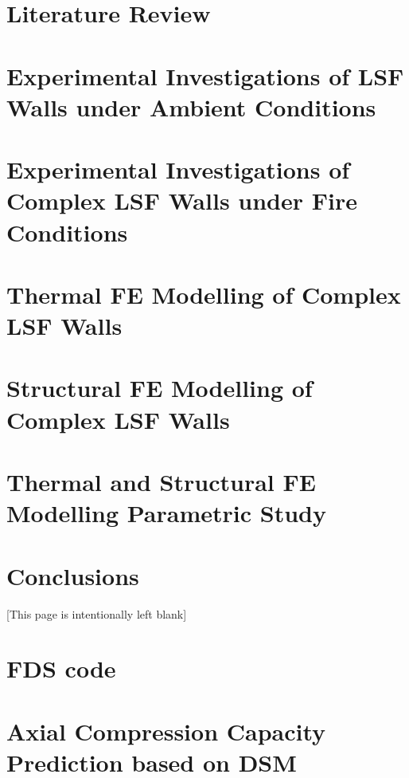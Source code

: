 \documentclass[twoside,openright,12pt]{book}
\makeatletter
\def\cleardoublepage{\clearpage%
	\if@twoside
	\ifodd\c@page\else
	\vspace*{\fill}
	\hfill
	\begin{center}
		[This page is intentionally left blank]
	\end{center}
	\vspace{\fill}
	\thispagestyle{empty}
	\newpage
	\if@twocolumn\hbox{}\newpage\fi
	\fi
	\fi
}
\makeatother
\begin{document}
\chapter{Literature Review}
\label{ch:Literature}       
 

\chapter{Experimental Investigations of LSF Walls under Ambient Conditions}
\label{ch:Ambient}       
 

\chapter{Experimental Investigations of Complex LSF Walls under Fire Conditions}
\label{ch:Fire}       
 

\chapter{Thermal FE Modelling of Complex LSF Walls}
\label{ch:FE-Thermal}       
 

\chapter{Structural FE Modelling of Complex LSF Walls}
\label{ch:FE-Structural}       


\chapter{Thermal and Structural FE Modelling Parametric Study}
\label{ch:FE-Parametric}       


\chapter{Conclusions}
\label{ch:Conclusions}       


\cleardoublepage

\appendix
\chapter{FDS code}
\label{app:fds-code}       


\chapter{Axial Compression Capacity Prediction based on DSM}
\label{app:dsm-prediction}       

\end{document}
